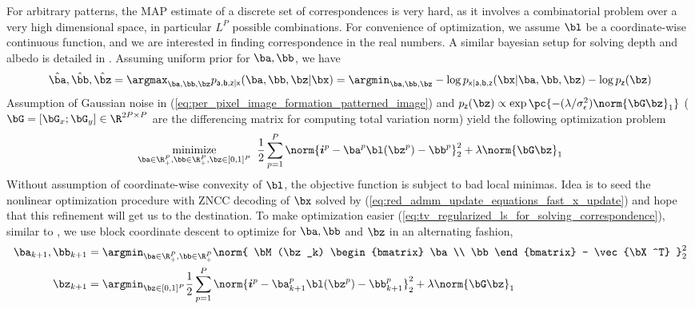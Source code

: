 \documentclass[../writeup.tex]{subfiles}
\begin{document}
For arbitrary patterns, the MAP estimate of a discrete set of correspondences is very hard, as it involves a combinatorial problem over a very high dimensional space, in particular $L^P$ possible combinations. For convenience of optimization, we assume $\bl$ be a coordinate-wise continuous function, and we are interested in finding correspondence in the real numbers. A similar bayesian setup for solving depth and albedo is detailed in \cite{adamBayesianTimeofFlightRealtime2015}. Assuming uniform prior for $\ba,\bb$, we have
\begin{align}
    \hat{\ba},\hat{\bb},\hat{\bz}
        = \argmax_{\ba,\bb,\bz} p_{\ra,\rb,\rz|\rx}(\ba,\bb,\bz|\bx)
        = \argmin_{\ba,\bb,\bz} -\log p_{\rx|\ra,\rb,\rz}(\bx|\ba,\bb,\bz) - \log p_{\rz}(\bz)
    \label{eq:map_inference_of_correspondence_is_hard}
\end{align}
Assumption of Gaussian noise in (\ref{eq:per_pixel_image_formation_patterned_image}) and $p_{\rz}(\bz)\propto \exp\pc{ - (\lambda/\sigma_{\epsilon}^2) \norm{\bG \bz}_1 }$ ($\bG=[\bG_x;\bG_y]\in \R^{2P\times P}$ are the differencing matrix for computing total variation norm) yield the following optimization problem
\begin{align}
    \underset{ \ba\in\R_+^P,\bb\in\R_+^P,\bz\in [0,1]^P }{\text{minimize}}\;\;
        \frac{1}{2} \sum_{ p=1 }^P \norm{ \si^p - \ba^p \bl(\bz^p) - \bb^p }_2^2 + \lambda \norm{\bG \bz}_1
    \label{eq:tv_regularized_ls_for_solving_correspondence}
\end{align}
Without assumption of coordinate-wise convexity of $\bl$, the objective function is subject to bad local minimas. Idea is to seed the nonlinear optimization procedure with ZNCC decoding of $\bx$ solved by (\ref{eq:red_admm_update_equations_fast_x_update}) and hope that this refinement will get us to the destination. To make optimization easier (\ref{eq:tv_regularized_ls_for_solving_correspondence}), similar to \cite{rosmanSparseModelingShape2012}, we use block coordinate descent to optimize for $\ba,\bb$ and $\bz$ in an alternating fashion,
\begin{align}
    \ba_{k+1},\bb_{k+1}
        &= \argmin_{\ba\in\R_+^P,\bb\in\R_+^P} \norm{ \bM(\bz_k) \begin{bmatrix}
            \ba \\ \bb
        \end{bmatrix} - \vec{\bX^T} }_2^2 
    \label{eq:tv_regularized_ls_for_solving_correspondence_altmin_1} \\
    \bz_{k+1}
        &= \argmin_{\bz\in[0,1]^P} \frac{1}{2} \sum_{ p=1 }^P \norm{ \si^p - \ba_{k+1}^p \bl(\bz^p) - \bb_{k+1}^p }_2^2 + \lambda \norm{\bG \bz}_1 
    \label{eq:tv_regularized_ls_for_solving_correspondence_altmin_2}
\end{align}
\end{document}
